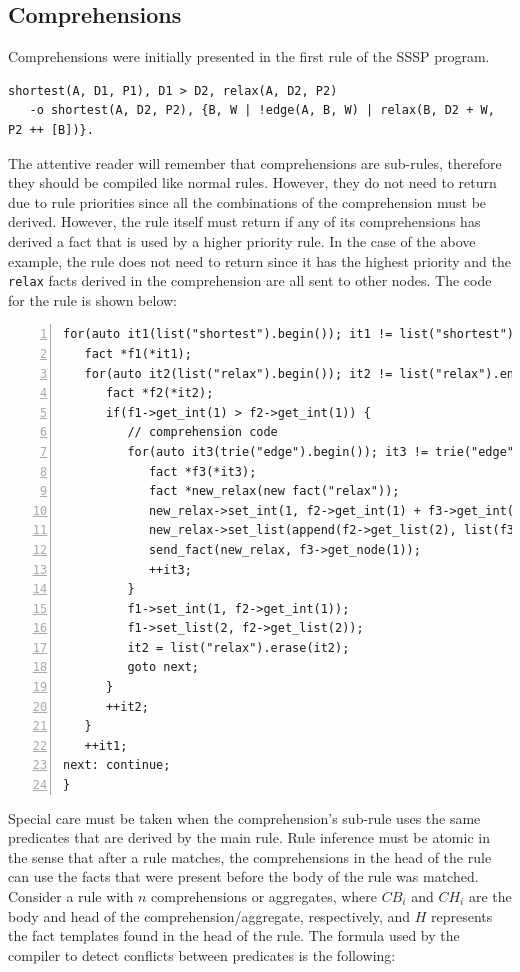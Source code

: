 \subsection{Comprehensions}

Comprehensions were initially presented in the first rule of the SSSP program.

\begin{Verbatim}[fontsize=\scriptsize]
shortest(A, D1, P1), D1 > D2, relax(A, D2, P2)
   -o shortest(A, D2, P2), {B, W | !edge(A, B, W) | relax(B, D2 + W, P2 ++ [B])}.
\end{Verbatim}

The attentive reader will remember that comprehensions are sub-rules, therefore
they should be compiled like normal rules. However, they do not need to return
due to rule priorities since all the combinations of the comprehension must be
derived. However, the rule itself must return if any of its comprehensions has
derived a fact that is used by a higher priority rule.  In the case of the above
example, the rule does not need to return since it has the highest priority and
the \texttt{relax} facts derived in the comprehension are all sent to other
nodes.  The code for the rule is shown below:

\begin{Verbatim}[numbers=left,fontsize=\scriptsize,xleftmargin=\codemargin]
for(auto it1(list("shortest").begin()); it1 != list("shortest").end(); ) {
   fact *f1(*it1);
   for(auto it2(list("relax").begin()); it2 != list("relax").end(); ) {
      fact *f2(*it2);
      if(f1->get_int(1) > f2->get_int(1)) {
         // comprehension code
         for(auto it3(trie("edge").begin()); it3 != trie("edge").end(); ) {
            fact *f3(*it3);
            fact *new_relax(new fact("relax"));
            new_relax->set_int(1, f2->get_int(1) + f3->get_int(2));
            new_relax->set_list(append(f2->get_list(2), list(f3->get_node(1))));
            send_fact(new_relax, f3->get_node(1));
            ++it3;
         }
         f1->set_int(1, f2->get_int(1));
         f1->set_list(2, f2->get_list(2));
         it2 = list("relax").erase(it2);
         goto next;
      }
      ++it2;
   }
   ++it1;
next: continue;
}
\end{Verbatim}

Special care must be taken when the comprehension's sub-rule uses the same
predicates that are derived by the main rule.
Rule inference must be atomic in the sense that after a rule matches, the
comprehensions in the head of the rule can use the facts that were present
before the body of the rule was matched.
Consider a rule with $n$ comprehensions or aggregates, where $CB_i$ and $CH_i$
are the body and head of the comprehension/aggregate, respectively, and $H$
represents the fact templates found in the head of the rule.
The formula used by the compiler to detect conflicts between predicates is the
following:

